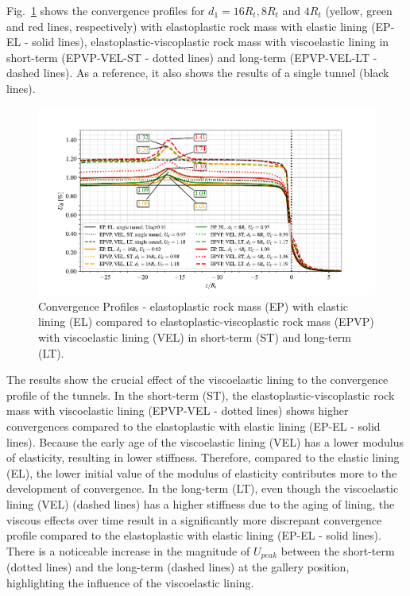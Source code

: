 \documentclass[a4paper,fleqn]{cas-sc}
\begin{document}
Fig.~\ref{EP-EL-EPVP-VEL-WG-ST-LT} shows the convergence profiles for $d_1 = 16R_t, 8R_t$ and $4R_t$ (yellow, green and red lines, respectively) with elastoplastic rock mass with elastic lining (EP-EL - solid lines), elastoplastic-viscoplastic rock mass with viscoelastic lining in short-term (EPVP-VEL-ST - dotted lines) and long-term (EPVP-VEL-LT - dashed lines). As a reference, it also shows the results of a single tunnel (black lines). 

\begin{figure}[h!]
	\centering
	\includegraphics[scale=0.9]{Convergence Profiles - EP_EL_EPVP_VEL_WG_ST_LT_anotate.pdf}
	\caption{Convergence Profiles - elastoplastic rock mass (EP) with elastic lining (EL) compared to elastoplastic-viscoplastic rock mass (EPVP) with viscoelastic lining (VEL) in short-term (ST) and long-term (LT).}
	\label{EP-EL-EPVP-VEL-WG-ST-LT}
\end{figure}
\FloatBarrier

The results show the crucial effect of the viscoelastic lining to the convergence profile of the tunnels. In the short-term (ST), the elastoplastic-viscoplastic rock mass with viscoelastic lining (EPVP-VEL - dotted lines) shows higher convergences compared to the elastoplastic with elastic lining (EP-EL - solid lines). Because the early age of the viscoelastic lining (VEL) has a lower modulus of elasticity, resulting in lower stiffness. Therefore, compared to the elastic lining (EL), the lower initial value of the modulus of elasticity contributes more to the development of convergence. In the long-term (LT), even though the viscoelastic lining (VEL) (dashed lines) has a higher stiffness due to the aging of lining, the viscous effects over time result in a significantly more discrepant convergence profile compared to the elastoplastic with elastic lining (EP-EL - solid lines). There is a noticeable increase in the magnitude of $U_{peak}$ between the short-term (dotted lines) and the long-term (dashed lines) at the gallery position, highlighting the influence of the viscoelastic lining.
\end{document}
